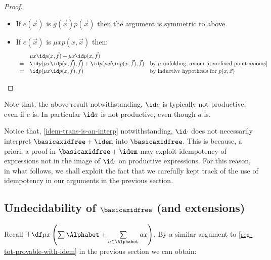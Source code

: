 \documentclass[runningheads]{amsart}
\begin{document}
\begin{proof}
\begin{itemize}
\[\begin{array}{rll}
           = & \id p(\vec f) \id g(\vec f) & \text{by inductive hypothesis for $p(\vec x)$} 
        \end{array}
        \]
        \item If $e(\vec x)$ is $g(\vec x)p(\vec x)$ then the argument is symmetric to above.
        \item If $e(\vec x)$ is $\mu x p(x,\vec x)$ then:
        \[
        \begin{array}{rll}
             & \mu x \id p(x,\vec f) + \mu x \id p(x,\vec f) 
             \\
              =  & \id p (\mu x \id p(x,\vec f),\vec f) + \id p (\mu x \id p(x,\vec f), \vec f) & \text{by $\mu$-unfolding, axiom \eqref{item:fixed-point-axioms}} \\
              = & \id p (\mu x \id p(x,\vec f),\vec f) & \text{by inductive hypothesis for $p(x,\vec x)$} \qedhere
        \end{array}
        \]
    \end{itemize}
\end{proof}

Note that, the above result notwithstanding, $\id e$ is typically not productive, even if $e$ is. In particular $\id a$ is not productive, even though $a$ is.

    Notice that, \cref{idem-trans-is-an-interp} notwithstanding, $\id \cdot$ does not necessarily interpret $\basicaxidfree + \idem$ into $\basicaxidfree$. This is because, a priori, a proof in $\basicaxidfree+\idem$ may exploit idempotency of expressions not in the image of $\id \cdot $ on productive expressions.
    For this reason, in what follows,
    we shall exploit the fact that we carefully kept track of the use of idempotency in our arguments in the previous section.

\subsection{Undecidability of $\basicaxidfree$ (and extensions)}
Recall $\top \df \mu x\left(\sum \Alphabet + \sum\limits_{a\in \Alphabet} ax\right)$.
By a similar argument to \cref{reg-tot-provable-with-idem} in the previous section we can obtain:
\end{document}
